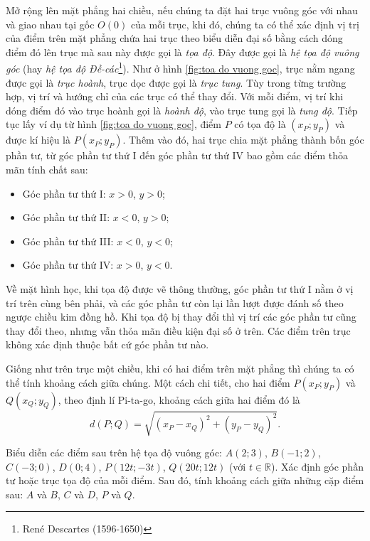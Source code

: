 \documentclass[a4paper, titlepage, openany]{book}
\newcounter{exercise}
\newcounter{solution}
\begin{document}
Mở rộng lên mặt phẳng hai chiều, nếu chúng ta đặt hai trục vuông góc với nhau và giao nhau tại gốc $O(0)$ của mỗi trục, khi đó, chúng ta có thể xác định vị trị của điểm trên mặt phẳng chứa hai trục theo biểu diễn đại số bằng cách dóng điểm đó lên trục mà sau này được gọi là \emph{tọa độ}. Đây được gọi là \emph{hệ tọa độ vuông góc} (hay \emph{hệ tọa độ Đề-các}\footnote{René Descartes (1596-1650)}). Như ở hình \ref{fig:toa do vuong goc}, trục nằm ngang được gọi là \emph{trục hoành}, trục dọc được gọi là \emph{trục tung}. Tùy trong từng trường hợp, vị trí và hướng chỉ của các trục có thể thay đổi. Với mỗi điểm, vị trí khi dóng điểm đó vào trục hoành gọi là \emph{hoành độ}, vào trục tung gọi là \emph{tung độ}. Tiếp tục lấy ví dụ từ hình \ref{fig:toa do vuong goc}, điểm $P$ có tọa độ là $(x_P;y_P)$ và được kí hiệu là $P(x_P;y_P)$. Thêm vào đó, hai trục chia mặt phẳng thành bốn góc phần tư, từ góc phần tư thứ I đến góc phần tư thứ IV bao gồm các điểm thỏa mãn tính chất sau:
\begin{itemize}
   \item Góc phần tư thứ I: $x>0$, $y>0$;
   \item Góc phần tư thứ II: $x<0$, $y>0$;
   \item Góc phần tư thứ III: $x<0$, $y<0$;
   \item Góc phần tư thứ IV: $x>0$, $y<0$.
\end{itemize}
Về mặt hình học, khi tọa độ được vẽ thông thường, góc phần tư thứ I nằm ở vị trí trên cùng bên phải, và các góc phần tư còn lại lần lượt được đánh số theo ngược chiều kim đồng hồ. Khi tọa độ bị thay đổi thì vị trí các góc phần tư cũng thay đổi theo, nhưng vẫn thỏa mãn điều kiện đại số ở trên. Các điểm trên trục không xác định thuộc bất cứ góc phần tư nào.

Giống như trên trục một chiều, khi có hai điểm trên mặt phẳng thì chúng ta có thể tính khoảng cách giữa chúng. Một cách chi tiết, cho hai điểm $P(x_P;y_P)$ và $Q(x_Q;y_Q)$, theo định lí Pi-ta-go, khoảng cách giữa hai điểm đó là $$d(P;Q)=\sqrt{(x_P-x_Q)^2+(y_P-y_Q)^2}.$$

\exercise[ex:0.2] Biểu diễn các điểm sau trên hệ tọa độ vuông góc: $A(2;3)$, $B(-1;2)$, $C(-3;0)$, $D(0;4)$, $P(12t;-3t)$, $Q(20t;12t)$ (với $t \in \mathbb{R}$). Xác định góc phần tư hoặc trục tọa độ của mỗi điểm. Sau đó, tính khoảng cách giữa những cặp điểm sau: $A$ và $B$, $C$ và $D$, $P$ và $Q$.

\solution[ex:0.2]
\end{document}
